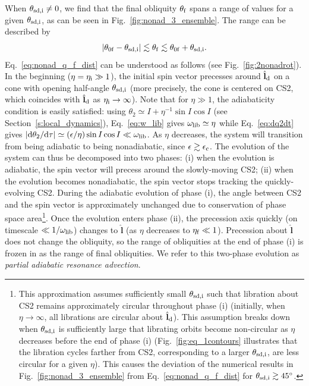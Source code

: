 \documentclass[twocolumn,twocolappendix]{aastex63}
\newcommand*{\rdil}[2]{\mathrm{d}#1 / \mathrm{d}#2}
\newcommand*{\abs}[1]{\left|#1\right|}
\newcommand*{\bsmb}[1]{\boldsymbol{\mathbf{#1}}}
\newcommand*{\uv}[1]{\hat{\bsmb{#1}}}
\newcommand*{\p}[1]{\left(#1\right)}
\begin{document}
When $\theta_{\rm sd, i}\neq 0$, we find that the final obliquity $\theta_{\rm
f}$ spans a range of values for a given $\theta_{\rm sd, i}$, as can be
seen in Fig.~\ref{fig:nonad_3_ensemble}. The range can be described by
\begin{equation}
    \abs{\theta_{\rm 0f} - \theta_{\rm sd, i}}
        \lesssim \theta_{\rm f}
        \lesssim \theta_{\rm 0f} + \theta_{\rm sd, i}
    .\label{eq:nonad_q_f_dist}
\end{equation}
Eq.~\eqref{eq:nonad_q_f_dist} can be understood as follows (see
Fig.~\ref{fig:2nonadrot}). In the beginning ($\eta = \eta_{\rm i} \gg 1$), the
initial spin vector precesses around $\uv{l}_{\rm d}$ on a cone with opening
half-angle $\theta_{\rm sd, i}$ (more precisely, the cone is centered on CS2,
which coincides with $\uv{l}_{\rm d}$ as $\eta_{\rm i} \to \infty$). Note that
for $\eta \gg 1$, the adiabaticity condition is easily satisfied: using
$\theta_2 \simeq I + \eta^{-1}\sin I \cos I$ (see
Section~\ref{s:local_dynamics}), Eq.~\eqref{eq:w_lib} gives $\omega_{\rm lib}
\simeq \eta$ while Eq.~\eqref{eq:dq2dt} gives $\abs{\rdil{\theta_2}{\tau}}
\simeq \p{\epsilon / \eta} \sin I \cos I \ll \omega_{\rm lib}$. As $\eta$
decreases, the system will transition from being adiabatic to being
nonadiabatic, since $\epsilon \gtrsim \epsilon_{\rm c}$. The evolution of the
system can thus be decomposed into two phases: (i) when the evolution is
adiabatic, the spin vector will precess around the slowly-moving CS2; (ii) when
the evolution becomes nonadiabatic, the spin vector stops tracking the
quickly-evolving CS2. During the adiabatic evolution of phase (i), the angle
between CS2 and the spin vector is approximately unchanged due to conservation
of phase space area\footnote{ This approximation assumes sufficiently small
$\theta_{\rm sd, i}$ such that libration about CS2 remains approximately
circular throughout phase (i) (initially, when $\eta \to \infty$, all librations
are circular about $\uv{l}_{\rm d}$). This assumption breaks down when
$\theta_{\rm sd, i}$ is sufficiently large that librating orbits become
non-circular as $\eta$ decreases before the end of phase (i)
(Fig.~\ref{fig:eq_1contours} illustrates that the libration cycles farther from
CS2, corresponding to a larger $\theta_{\rm sd, i}$, are less circular for a
given $\eta$).
This causes the deviation of the numerical results in
Fig.~\ref{fig:nonad_3_ensemble} from Eq.~\eqref{eq:nonad_q_f_dist} for
$\theta_{\rm sd, i} \gtrsim 45^\circ$. }.
Once the evolution enters phase (ii), the precession axis
quickly (on timescale $\ll 1 / \omega_{\rm lib}$) changes to $\uv{l}$ (as $\eta$
decreases to $\eta_{\rm f} \ll 1$). Precession about $\uv{l}$ does not change the
obliquity, so the range of obliquities at the end of phase (i) is frozen in as
the range of final obliquities. We refer to this two-phase
evolution as \emph{partial adiabatic resonance advection}.
\end{document}
